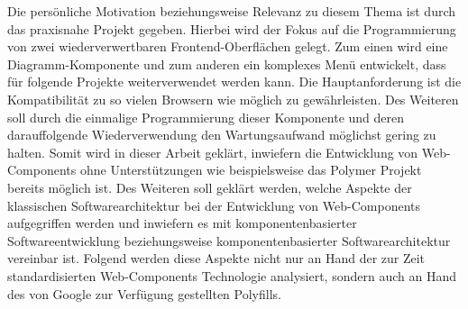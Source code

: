 Die persönliche Motivation beziehungsweise Relevanz zu diesem Thema ist durch das praxisnahe Projekt gegeben. Hierbei wird der Fokus auf die Programmierung von zwei wiederverwertbaren Frontend-Oberflächen gelegt. Zum einen wird eine Diagramm-Komponente und zum anderen ein komplexes Menü entwickelt, dass für folgende Projekte weiterverwendet werden kann. Die Hauptanforderung ist die Kompatibilität zu so vielen Browsern wie möglich zu gewährleisten. Des Weiteren soll durch die einmalige Programmierung dieser Komponente und deren darauffolgende Wiederverwendung den Wartungsaufwand möglichst gering zu halten. Somit wird in dieser Arbeit geklärt, inwiefern die Entwicklung von Web-Components ohne Unterstützungen wie beispielsweise das Polymer Projekt bereits möglich ist. Des Weiteren soll geklärt werden, welche Aspekte der klassischen Softwarearchitektur bei der Entwicklung von Web-Components aufgegriffen werden und inwiefern es mit komponentenbasierter Softwareentwicklung beziehungsweise komponentenbasierter Softwarearchitektur vereinbar ist. Folgend werden diese Aspekte nicht nur an Hand der zur Zeit standardisierten Web-Components Technologie analysiert, sondern auch an Hand des von Google zur Verfügung gestellten Polyfills.

